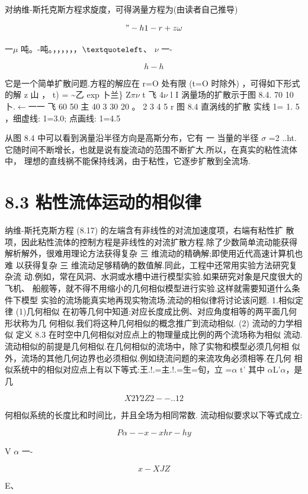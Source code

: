 对纳维-斯托克斯方程求旋度，可得涡量方程为(由读者自己推导)

\["-h 1-r + z\omega \]

一$\mu$ 吨。-吨。，，，，，，${\rm ‘}$、 $\nu$ 一-

\[h-h\]

它是一个简单扩散问题.方程的解应在 r=O 处有限 (t=O 时除外) ，可得如下形式 的解 z 山 ， t) = \textasciitilde{}乙 exp 卜兰\} Z$\pi$$\nu$ t 飞 4$\nu$ l I 涡量场的扩散示于图 8.4. 70 10 卜.$\leftarrow$一一 飞 60 50 主 40 3 30 20 。 2 3 4 5 r 图 8.4 直涡线的扩散 实线 1= 1. 5 ，细虚线: 1=3.0; 点画线: 1=4.5

从图 8.4 中可以看到涡量沿半径方向是高斯分布，它有 一 当量的半径 $\sigma$ =2 ..ht. 它随时间不断增长，也就是说有旋流动的范围不断扩大.所以，在真实的粘性流体中， 理想的直线祸不能保持线涡，由于粘性，它逐步扩散到全流场.

\section*{8.3  粘性流体运动的相似律}

纳维-斯托克斯方程 (8.17) 的左端含有非线性的对流加速度项，右端有粘性扩 散项，因此粘性流体的控制方程是非线性的对流扩散方程.除了少数简单流动能获得 解析解外，很难用理论方法获得复杂 三 维流动的精确解;即使用近代高速计算机也难 以获得复杂 三 维流动足够精确的数值解.同此，工程中还常用实验方法研究复杂流 动.例如，常在风洞、水洞或水槽中进行模型实验.如果研究对象是尺度很大的飞机、 船舰等，就不得不用缩小的几何相似模型进行实验.这样就需要知道什么条件下模型 实验的流场能真实地再现实物流场.流动的相似律将讨论该问题. 1.相似定律 (1)几何相似 在初等几何中知道:对应长度成比例、对应角度相等的两平面几何形状称为几 何相似.我们将这种几何相似的概念推广到流动相似. (2) 流动的力学相似 定义 8.3 在时空中几何相似对应点上的物理量成比例的两个流场称为相似 流动. 流动相似的前提是几何相似.在几何相似的流场中，除了实物和模型必须几何相 似外，流场的其他几何边界也必须相似.例如绕流问题的来流攻角必须相等.在几何 相似系统中的相似对应点上有以下等式:王.!.=主.!.=生=旬，立 =$\alpha$ t' 其中 $\alpha$L'$\alpha$，是几

\[X2 Y2 Z 2 --. . 12\]

何相似系统的长度比和时间比，并且全场为相同常数. 流动相似要求以下等式成立:

\[P \alpha  --x-x hr-hy\]

V $\alpha$ 一-

\[x-X JZ\]

E、

